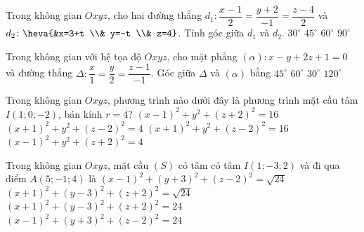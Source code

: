 \begin{ex}%
	Trong không gian $Oxyz$, cho hai đường thẳng $d_1 \colon \dfrac{x-1}{2}=\dfrac{y+2}{-1}=\dfrac{z-4}{2}$ và \\ $d_2\colon \heva{&x=3+t \\& y=-t \\& z=4}$. Tính góc giữa $d_1$ và $d_2$.
	\choice
	{$30^\circ$}
	{\True $45^\circ$}
	{$60^\circ$}
	{$90^\circ$}
\end{ex}

\begin{ex}%
	Trong không gian với hệ tọa độ $Oxyz$, cho mặt phẳng $(\alpha)\colon x-y+2z+1=0$ và đường thẳng $\Delta\colon \dfrac{x}{1}=\dfrac{y}{2}=\dfrac{z-1}{-1}$. Góc giữa $\Delta$ và $(\alpha)$ bằng
	\choice
	{$45^\circ$}
	{$60^\circ$}
	{\True $30^\circ$}
	{$120^\circ$}
\end{ex}

\begin{ex}%
	Trong không gian $O x y z$, phương trình nào dưới đây là phương trình mặt cầu tâm $I(1 ; 0 ;-2)$, bán kính $r=4$?
	\choice
	{\True $(x-1)^{2}+y^{2}+(z+2)^{2}=16$}
	{$(x+1)^{2}+y^{2}+(z-2)^{2}=4$}
	{$(x+1)^{2}+y^{2}+(z-2)^{2}=16$}
	{$(x-1)^{2}+y^{2}+(z+2)^{2}=4$}
\end{ex}

\begin{ex}%
	Trong không gian $O x y z$, mặt cầu $(S)$ có tâm có tâm $I(1 ;-3 ; 2)$ và đi qua điểm $A(5 ;-1 ; 4)$ là
	\choice
	{$(x-1)^{2}+(y+3)^{2}+(z-2)^{2}=\sqrt{24}$}
	{$(x+1)^{2}+(y-3)^{2}+(z+2)^{2}=\sqrt{24}$}
	{$(x+1)^{2}+(y-3)^{2}+(z+2)^{2}=24$}
	{\True $(x-1)^{2}+(y+3)^{2}+(z-2)^{2}=24$}
\end{ex}

